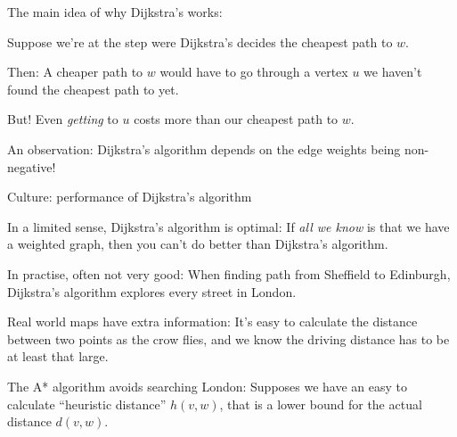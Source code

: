 \documentclass{beamer}
\begin{document}
\begin{frame}{The main idea of why Dijkstra's works:}


Suppose we're at the step were Dijkstra's decides the cheapest path to $w$. 
\begin{block}{Then:}
A cheaper path to $w$ would have to go through a vertex $u$ we haven't found the cheapest path to yet.
  \end{block}

  \begin{block}{But!}
Even \emph{getting} to $u$ costs more than our cheapest path to $w$.
    \end{block}

  \begin{block}{An observation:}
Dijkstra's algorithm depends on the edge weights being non-negative!
  \end{block}
  
  \end{frame}

\begin{frame}{Culture: performance of Dijkstra's algorithm}
  \begin{block}{In a limited sense, Dijkstra's algorithm is optimal:}
If \emph{all we know} is that we have a weighted graph, then you can't do better than Dijkstra's algorithm.
    \end{block}
  \begin{block}{In practise, often not very good:}
 When finding path from Sheffield to Edinburgh, Dijkstra's algorithm explores every street in London.
  \end{block}
  \begin{block}{Real world maps have extra information:}
    It's easy to calculate the distance between two points as the crow flies, and we know the driving distance has to be at least that large.  
\end{block}  
  \begin{block}{The A* algorithm avoids searching London:}
    Supposes we have an easy to calculate ``heuristic distance'' $h(v,w)$, that is a lower bound for the actual distance $d(v,w)$. 
    \end{block}
\end{frame}
\end{document}
